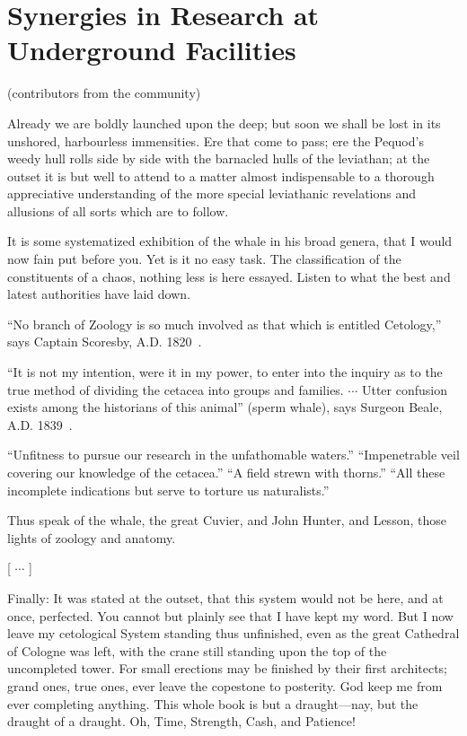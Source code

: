 
\setcounter{chapter}{4} 


\chapter{Synergies in Research at Underground Facilities}

   {(contributors from the community)}


Already we are boldly launched upon the deep; but soon we shall be lost in its unshored, harbourless immensities. Ere that come to pass; ere the Pequod’s weedy hull rolls side by side with the barnacled hulls of the leviathan; at the outset it is but well to attend to a matter almost indispensable to a thorough appreciative understanding of the more special leviathanic revelations and allusions of all sorts which are to follow.

It is some systematized exhibition of the whale in his broad genera, that I would now fain put before you. Yet is it no easy task. The classification of the constituents of a chaos, nothing less is here essayed. Listen to what the best and latest authorities have laid down.

``No branch of Zoology is so much involved as that which is entitled Cetology,'' says Captain Scoresby, A.D. 1820~\cite{U5-Scoresby}.

``It is not my intention, were it in my power, to enter into the inquiry as to the true method of dividing the cetacea into groups and families. $\cdots$ Utter confusion exists among the historians of this animal'' (sperm whale), says Surgeon Beale, A.D. 1839~\cite{U5-Beale}.

``Unfitness to pursue our research in the unfathomable waters.'' ``Impenetrable veil covering our knowledge of the cetacea.''  ``A field strewn with thorns.'' ``All these incomplete indications but serve to torture us naturalists.''

Thus speak of the whale, the great Cuvier, and John Hunter, and Lesson, those lights of zoology and anatomy.

[ $\cdots$ ]

Finally: It was stated at the outset, that this system would not be here, and at once, perfected. You cannot but plainly see that I have kept my word. But I now leave my cetological System standing thus unfinished, even as the great Cathedral of Cologne was left, with the crane still standing upon the top of the uncompleted tower. For small erections may be finished by their first architects; grand ones, true ones, ever leave the copestone to posterity. God keep me from ever completing anything. This whole book is but a draught---nay, but the draught of a draught. Oh, Time, Strength, Cash, and Patience!


